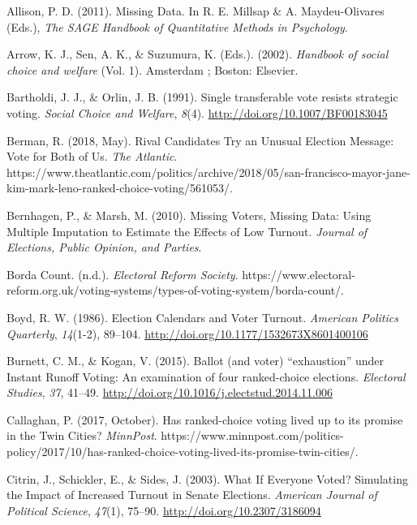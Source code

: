 \documentclass[12pt,twoside]{reedthesis}
\begin{document}
\leavevmode\hypertarget{ref-allison_missing_2011}{}%
Allison, P. D. (2011). Missing Data. In R. E. Millsap \& A. Maydeu-Olivares (Eds.), \emph{The SAGE Handbook of Quantitative Methods in Psychology}.

\leavevmode\hypertarget{ref-arrow_handbook_2002}{}%
Arrow, K. J., Sen, A. K., \& Suzumura, K. (Eds.). (2002). \emph{Handbook of social choice and welfare} (Vol. 1). Amsterdam ; Boston: Elsevier.

\leavevmode\hypertarget{ref-bartholdi_single_1991}{}%
Bartholdi, J. J., \& Orlin, J. B. (1991). Single transferable vote resists strategic voting. \emph{Social Choice and Welfare}, \emph{8}(4). \url{http://doi.org/10.1007/BF00183045}

\leavevmode\hypertarget{ref-berman_rival_2018}{}%
Berman, R. (2018, May). Rival Candidates Try an Unusual Election Message: Vote for Both of Us. \emph{The Atlantic}. https://www.theatlantic.com/politics/archive/2018/05/san-francisco-mayor-jane-kim-mark-leno-ranked-choice-voting/561053/.

\leavevmode\hypertarget{ref-bernhagen_missing_2010}{}%
Bernhagen, P., \& Marsh, M. (2010). Missing Voters, Missing Data: Using Multiple Imputation to Estimate the Effects of Low Turnout. \emph{Journal of Elections, Public Opinion, and Parties}.

\leavevmode\hypertarget{ref-noauthor_borda_nodate}{}%
Borda Count. (n.d.). \emph{Electoral Reform Society}. https://www.electoral-reform.org.uk/voting-systems/types-of-voting-system/borda-count/.

\leavevmode\hypertarget{ref-boyd_election_1986}{}%
Boyd, R. W. (1986). Election Calendars and Voter Turnout. \emph{American Politics Quarterly}, \emph{14}(1-2), 89--104. \url{http://doi.org/10.1177/1532673X8601400106}

\leavevmode\hypertarget{ref-burnett_ballot_2015}{}%
Burnett, C. M., \& Kogan, V. (2015). Ballot (and voter) ``exhaustion'' under Instant Runoff Voting: An examination of four ranked-choice elections. \emph{Electoral Studies}, \emph{37}, 41--49. \url{http://doi.org/10.1016/j.electstud.2014.11.006}

\leavevmode\hypertarget{ref-callaghan_has_2017}{}%
Callaghan, P. (2017, October). Has ranked-choice voting lived up to its promise in the Twin Cities? \emph{MinnPost}. https://www.minnpost.com/politics-policy/2017/10/has-ranked-choice-voting-lived-its-promise-twin-cities/.

\leavevmode\hypertarget{ref-citrin_what_2003}{}%
Citrin, J., Schickler, E., \& Sides, J. (2003). What If Everyone Voted? Simulating the Impact of Increased Turnout in Senate Elections. \emph{American Journal of Political Science}, \emph{47}(1), 75--90. \url{http://doi.org/10.2307/3186094}
\end{document}
